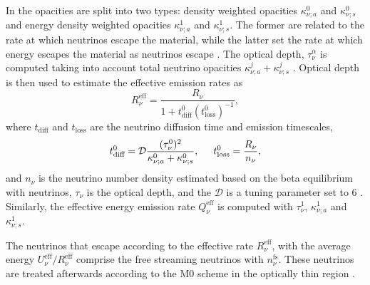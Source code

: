 %
%
In \wisky{} the opacities are split into two types: density weighted opacities $\kappa_{\nu;a}^0$ and
$\kappa_{\nu;s}^0$ and energy density weighted opacities $\kappa_{\nu;a}^1$ and $\kappa_{\nu;s}^1$. 
The former are related to the rate at which neutrinos escape the material, 
while the latter set the rate at which energy escapes the material as neutrinos escape 
\citep{Ruffert:1995fs}.
%
The optical depth, $\tau_{\nu}^{\alpha}$ is computed taking into account 
total neutrino opacities $\kappa_{\nu;a}^j + \kappa_{\nu;s}^j$ \citep{Neilsen:2014hha}.
%
Optical depth is then used to estimate the effective emission rates \citep{Ruffert:1995fs} as 
%
\begin{equation}
R_{\nu}^{\text{eff}} = \frac{R_{\nu}}{1 + t_{\text{diff}}^0(t^0_{\text{loss}})^{-1}},
\label{eq:method:whisky:Rnueff}
\end{equation}
%
where $t_{\text{diff}}$ and $t_{\text{loss}}$ are the neutrino diffusion time and emission timescales,
%
\begin{equation}
t_{\text{diff}}^{0} = \mathcal{D}\frac{(\tau_{\nu}^0)^2}{\kappa_{\nu;a}^0 + \kappa_{\nu;s}^0}, \hspace{5mm} t_{\text{loss}}^0 = \frac{R_{\nu}}{n_{\nu}},
\end{equation}
%
%
%
and $n_{\nu}$ is the neutrino number density estimated based on the 
beta equilibrium with neutrinos, $\tau_{\nu}$ is the optical depth, and 
the $\mathcal{D}$ is a tuning parameter set to $6$ \citep{Radice:2018pdn}.
%
Similarly, the effective energy emission rate $Q_{\nu}^{\text{eff}}$ 
is computed with $\tau_{\nu}^1$, $\kappa_{\nu;a}^1$ and $\kappa_{\nu;s}^1$.

The neutrinos that escape according to the effective rate $R_{\nu}^{\text{eff}}$,
with the average energy $U_{\nu}^{\text{eff}}/R_{\nu}^{\text{eff}}$ 
comprise the free streaming neutrinos with $n_{\nu}^{\text{fs}}$. 
%
These neutrinos are treated afterwards according to the 
M0 scheme in the optically thin region \citep{Radice:2016dwd}.

